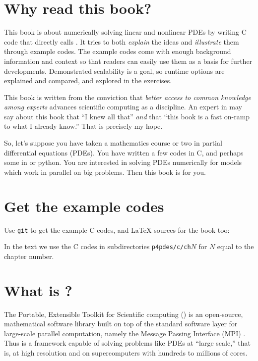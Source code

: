 
\section{Why read this book?}

This book is about numerically solving linear and nonlinear PDEs by writing C code that directly calls \PETSc.  It tries to both \emph{explain} the ideas and \emph{illustrate} them through example codes.  The example codes come with enough background information and context so that readers can easily use them as a basis for further developments.  Demonstrated scalability is a goal, so runtime options are explained and compared, and explored in the exercises.

This book is written from the conviction that \emph{better access to common knowledge among experts} advances scientific computing as a discipline.  An expert in \PETSc may say about this book that ``I knew all that'' \emph{and} that ``this book is a fast on-ramp to what I already know.''  That is precisely my hope.

So, let's suppose you have taken a mathematics course or two in partial differential equations (PDEs).  You have written a few codes in C,\cite{KernighanRitchie1988} and perhaps some in \Matlab or python.  You are interested in solving PDEs numerically for models which work in parallel on big problems.  Then this book is for you.

\section{Get the example codes}

Use \texttt{git} to get the example C codes, and \LaTeX\xspace sources for the book too:
In the text we use the C codes in subdirectories \texttt{p4pdes/c/ch}$N$ for $N$ equal to the chapter number.

\section{What is \PETSc?}

The Portable, Extensible Toolkit for Scientific computing (\PETSc) is an open-source, mathematical software library built on top of the standard software layer for large-scale parallel computation, namely the Message Passing Interface (MPI) \citep{Groppetal1999}.  Thus \PETSc is a framework capable of solving problems like PDEs at ``large scale,'' that is, at high resolution and on supercomputers with hundreds to millions of cores.

